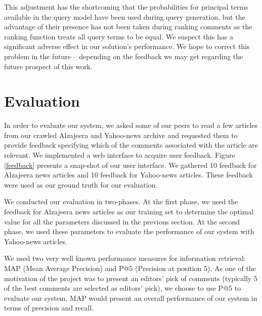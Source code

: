 \documentclass[article]{IEEEtran}
\begin{document}
This adjustment has the shortcoming that the probabilities for principal terms available in the query model have been used during query generation, but the advantage of their presence has not been taken during ranking comments as the ranking function treats all query terms to be equal. We suspect this has a significant adverse effect in our solution's performance. We hope to correct this problem in the future -- depending on the feedback we may get regarding the future prospect of this work.       
     


\section{Evaluation}
\label{ev}
In order to evaluate our system, we asked some of our peers to read a few articles from our crawled Alzajeera and Yahoo-news archive and requested them to provide feedback specifying which of the comments associated with the article are relevant. We implemented a web interface  to acquire user feedback. Figure \ref{feedback} presents a snap-shot of our user interface. We gathered 10 feedback for Alzajeera news articles and 10 feedback for Yahoo-news articles. These feedback were used as our ground truth for our evaluation.  

We conducted our evaluation in two-phases. At the first phase, we used the feedback  for Alzajeera news articles as our training set to determine the optimal value for all the parameters discussed in the previous section. At the second phase, we used these parameters to evaluate the performance of our system with Yahoo-news articles.

We used two very well known performance measures for information retrieval: MAP (Mean Average Precision) and P@5 (Precision at position 5). As one of the motivation of the project was to present an editors' pick of comments (typically 5 of the best comments are selected as editors' pick), we choose to use P@5 to evaluate our system. MAP would present an overall performance of our system in terms of precision and recall.
\end{document}
